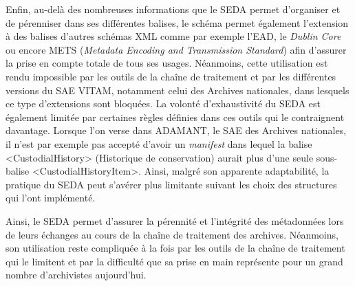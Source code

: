 

Enfin, au-delà des nombreuses informations que le \gls{SEDA} permet d’organiser et de pérenniser dans ses différentes balises, le schéma permet également l’extension à des balises d’autres schémas \gls{XML} comme par exemple l’\gls{EAD}, le \textit{Dublin Core} ou encore METS (\textit{Metadata Encoding and Transmission Standard}) afin d’assurer la prise en compte totale de tous ses usages. Néanmoins, cette utilisation est rendu impossible par les outils de la chaîne de traitement et par les différentes versions du \gls{SAE} \gls{VITAM}, notamment celui des Archives nationales, dans lesquels ce type d’extensions sont bloquées. La volonté d’exhaustivité du \gls{SEDA} est également limitée par certaines règles définies dans ces outils qui le contraignent davantage. Lorsque l’on verse dans ADAMANT, le \gls{SAE} des Archives nationales, il n’est par exemple pas accepté d’avoir un \textit{\gls{manifest}} dans lequel la balise <CustodialHistory> (Historique de conservation) aurait plus d’une seule sous-balise <CustodialHistoryItem>. Ainsi, malgré son apparente adaptabilité, la pratique du \gls{SEDA} peut s’avérer plus limitante suivant les choix des structures qui l’ont implémenté. 


Ainsi, le \gls{SEDA} permet d’assurer la pérennité et l’intégrité des métadonnées lors de leurs échanges au cours de la chaîne de traitement des archives. Néanmoins, son utilisation reste compliquée à la fois par les outils de la chaîne de traitement qui le limitent et par la difficulté que sa prise en main représente pour un grand nombre d’archivistes aujourd’hui. 